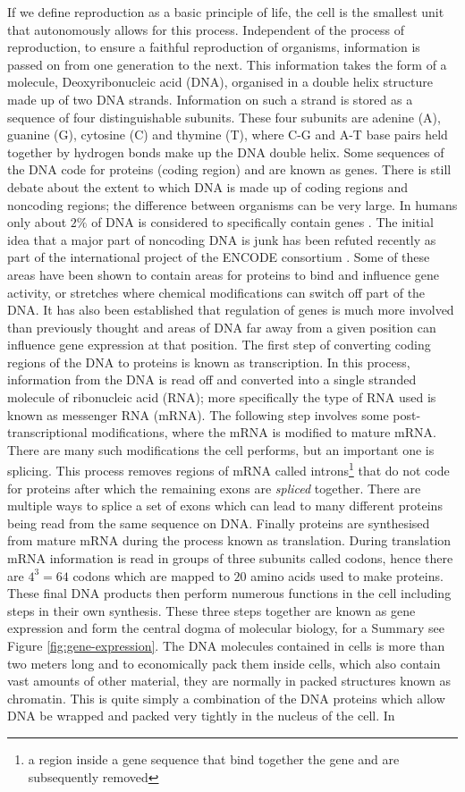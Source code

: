 If we define reproduction as a basic principle of life, the cell is the smallest unit that autonomously allows for this process. Independent of the process of reproduction, to ensure a faithful reproduction of organisms, information is passed on from one generation to the next. This information takes the form of a molecule, Deoxyribonucleic acid (DNA), organised in a double helix structure made up of two DNA strands. Information on such a strand is stored as a sequence of four distinguishable subunits. These four subunits are adenine (A), guanine (G), cytosine (C) and thymine (T), where C-G and A-T base pairs held together by hydrogen bonds make up the DNA double helix. Some sequences of the DNA code for proteins (coding region) and are known as genes.  There is still debate about the extent to which DNA is made up of coding regions and noncoding regions; the difference between organisms can be very large. In humans only about $2\%$ of DNA is considered to specifically contain genes \citep{Elgar:2008dm}. The initial idea that a major part of noncoding DNA is junk has been refuted recently as part of the international project of the ENCODE consortium \citep{Pennisi:2012wl}. Some of these areas have been shown to contain areas for proteins to bind and influence gene activity, or stretches where chemical modifications can  switch off part of the DNA. It has also been established that regulation of genes is much more involved than previously thought and areas of DNA far away from a given position can influence gene expression at that position. The first step of converting coding regions of the DNA to proteins is known as transcription. In this process, information from the DNA is read off and converted into a single stranded molecule of ribonucleic acid (RNA); more specifically the type of RNA used is known as messenger RNA (mRNA). The following step involves some post-transcriptional modifications, where the mRNA is modified to mature mRNA. There are many such modifications the cell performs, but an important one is splicing. This process removes regions of mRNA called introns\footnote{a region inside a gene sequence that bind together the gene and are subsequently removed} that do not code for proteins after which the remaining exons are \emph{spliced} together. There are multiple ways to splice a set of exons which can lead to many different proteins being read from the same sequence on DNA. Finally proteins are synthesised from mature mRNA during the process known as translation. During translation mRNA information is read in groups of three subunits called codons, hence there are $4^3 = 64$ codons which are mapped to $20$ amino acids used to make proteins. These final DNA products then perform numerous functions in the cell including steps in their own synthesis. These three steps together are known as gene expression and form the central dogma of molecular biology, for a Summary see Figure \ref{fig:gene-expression}. The DNA molecules contained in cells is more than two meters long and to economically pack them inside cells, which also contain vast amounts of other material, they are normally in packed structures known as chromatin. This is quite simply a combination of the DNA proteins which allow DNA be wrapped and packed very tightly in the nucleus of the cell. In 